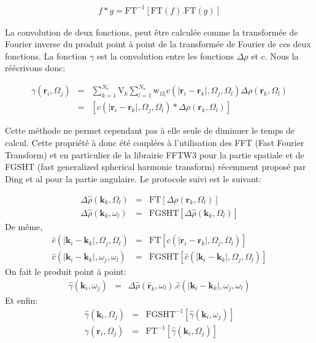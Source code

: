 \begin{eqnarray}
f*g = \mathrm{FT}^{-1} [ \mathrm{FT}(f) . \mathrm{FT}(g) ]
\end{eqnarray}

La convolution de deux fonctions, peut être calculée comme la transformée de Fourier inverse du produit point à point de la transformée de Fourier de ces deux fonctions. La fonction $\gamma$ est la convolution entre les fonctions $\Delta\rho$ et $c$. Nous la réécrivons donc:

\begin{eqnarray}
\gamma\left(\boldsymbol{r}_i,\Omega_j\right) &=& \sum\limits_{k=1}^{N_v}\mathrm{V}_k\sum\limits_{l=1}^{N_o} \mathrm{w}_{\Omega_l}c\left( \left|\boldsymbol{r}_i-\boldsymbol{r}_k\right|,\Omega_j,\Omega_l \right) \Delta\rho\left(\boldsymbol{r}_k,\Omega_l\right) \\
&=& [ c\left( \left|\boldsymbol{r}_i-\boldsymbol{r}_k\right|,\Omega_j,\Omega_l \right) * \Delta\rho\left(\boldsymbol{r}_k,\Omega_l\right) ]
\end{eqnarray}


Cette méthode ne permet cependant pas à elle seule de diminuer le temps de calcul. Cette propriété à donc été couplées à l'utilisation des FFT (Fast Fourier Transform) et en particulier de la librairie FFTW3 pour la partie spatiale et de FGSHT (fast generalized spherical harmonic transform) récemment proposé par Ding et al\cite{ding_thesis} pour la partie angulaire. Le protocole suivi est le suivant:

\begin{eqnarray}
\Delta\hat{\rho}\left(\boldsymbol{k}_k,\Omega_l\right) &=& \mathrm{FT}[\Delta\rho\left(\boldsymbol{r}_k,\Omega_l\right)] \\
\Delta\hat{\rho}\left(\boldsymbol{k}_k,\omega_l\right) &=& \mathrm{FGSHT}[\Delta\hat{\rho}\left(\boldsymbol{k}_k,\Omega_l\right)]
\end{eqnarray}
De même,
\begin{eqnarray}
\hat{c}\left( \left|\boldsymbol{k}_i-\boldsymbol{k}_k\right|,\Omega_j,\Omega_l \right) &=& \mathrm{FT}[c\left( \left|\boldsymbol{r}_i-\boldsymbol{r}_k\right|,\Omega_j,\Omega_l \right)] \\
\hat{c}\left( \left|\boldsymbol{k}_i-\boldsymbol{k}_k\right|,\omega_j,\omega_l \right) &=& \mathrm{FGSHT}[\hat{c}\left( 
\left|\boldsymbol{k}_i-\boldsymbol{k}_k\right|,\Omega_j,\Omega_l \right)]
\end{eqnarray}
On fait le produit point à point:
\begin{eqnarray}
\hat{\gamma}(\boldsymbol{k}_i,\omega_j) &=& \Delta\hat{\rho}\left(\boldsymbol{\hat{r}}_k,\omega_l\right) . \hat{c}\left( \left|\boldsymbol{k}_i-\boldsymbol{k}_k\right|,\omega_j,\omega_l \right)
\end{eqnarray}
Et enfin:
\begin{eqnarray}
\hat{\gamma}(\boldsymbol{k}_i,\Omega_j) &=& \mathrm{FGSHT}^{-1}[\hat{\gamma}(\boldsymbol{k}_i,\omega_j)]\\
\gamma(\boldsymbol{r}_i,\Omega_j) &=& \mathrm{FT}^{-1}[\hat{\gamma}(\boldsymbol{k}_i,\Omega_j)]
\end{eqnarray}

